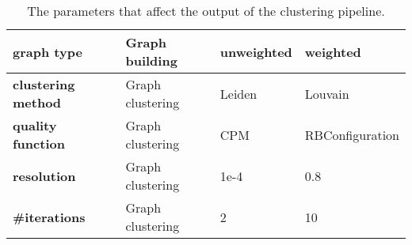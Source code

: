 \begin{table}[]
{\begin{tabular}{|l|l|l|l|}
            \textbf{graph type}         & \cellcolor[HTML]{BE809D}Graph building   & unweighted                 & weighted                   \\ \hline
            \textbf{clustering method}  & \cellcolor[HTML]{72B980}Graph clustering & Leiden                     & Louvain                    \\ \hline
            \textbf{quality function}   & \cellcolor[HTML]{72B980}Graph clustering & CPM                        & RBConfiguration            \\ \hline
            \textbf{resolution}         & \cellcolor[HTML]{72B980}Graph clustering & 1e-4                       & 0.8                        \\ \hline
            \textbf{\#iterations}       & \cellcolor[HTML]{72B980}Graph clustering & 2                          & 10                         \\ \hline
        \end{tabular}}
    \caption{\label{tab:param}The parameters that affect the output of the clustering pipeline.}
\end{table}